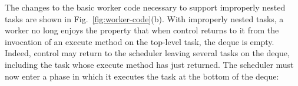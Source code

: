 The changes to the basic worker code necessary to support improperly
nested tasks are shown in Fig.~\ref{fig:worker-code}(b). With
improperly nested tasks, a worker no long enjoys the property that
when control returns to it from the invocation of an execute method on
the top-level task, the deque is empty. Indeed, control may return to
the scheduler leaving several tasks on the deque, including the task
whose execute method has just returned. The scheduler must now enter a
phase in which it executes the task at the bottom of the deque:

%


%
%
%
%
%
%
%

